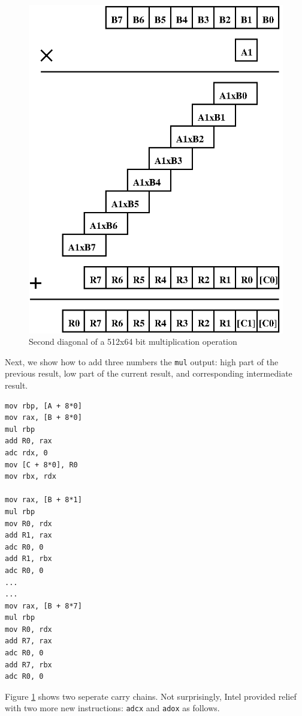 \documentclass[twocolumn]{svjour3}          %
\begin{document}
\begin{figure}[ht]
\centering
  \includegraphics[scale=0.7]{multdiag1.eps}
\caption{Second diagonal of a 512x64 bit multiplication operation}
\label{fig:diag1}
\end{figure}

Next, we show how to add three numbers the \texttt{mul} output: 
high part of the previous result, low part of the current result, and corresponding intermediate result.

\begin{verbatim}
mov rbp, [A + 8*0]
mov rax, [B + 8*0]
mul rbp	
add	R0, rax
adc rdx, 0
mov [C + 8*0], R0
mov rbx, rdx

mov rax, [B + 8*1]
mul rbp
mov R0, rdx
add R1, rax
adc R0, 0
add R1, rbx
adc R0, 0
...
...
mov rax, [B + 8*7]
mul rbp
mov R0, rdx
add R7, rax
adc R0, 0
add R7, rbx
adc R0, 0
\end{verbatim}

Figure \ref{fig:diag1} shows two seperate carry chains.
Not surprisingly, Intel provided relief with two more new instructions: \texttt{adcx} and \texttt{adox} as follows.
\end{document}
